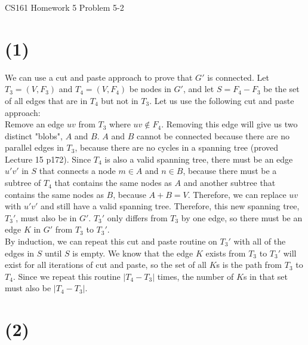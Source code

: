 \documentclass[12pt]{article}
\begin{document}
\begin{center}
{\Large CS161 Homework 5 Problem 5-2}

\end{center}

\section*{(1)}
We can use a cut and paste approach to prove that $G'$ is connected. Let $T_3 = (V, F_3)$ and $T_4 = (V, F_4)$ be nodes in $G'$, and let $S = F_4-F_3$ be the set of all edges that are in $T_4$ but not in $T_3$. Let us use the following cut and paste approach: \\
Remove an edge $uv$ from $T_3$ where $uv \notin F_4$. Removing this edge will give us two distinct "blobs", $A$ and $B$. $A$ and $B$ cannot be connected because there are no parallel edges in $T_3$, because there are no cycles in a spanning tree (proved Lecture 15 p172). Since $T_4$ is also a valid spanning tree, there must be an edge $u'v'$ in $S$ that connects a node $m \in A$ and $n \in B$, because there must be a subtree of $T_4$ that contains the same nodes as $A$ and another subtree that contains the same nodes as $B$, because $A + B = V$. Therefore, we can replace $uv$ with $u'v'$ and still have a valid spanning tree. Therefore, this new spanning tree, $T_3'$, must also be in $G'$. $T_3'$ only differs from $T_3$ by one edge, so there must be an edge $K$ in $G'$ from $T_3$ to $T_3'$.\\
By induction, we can repeat this cut and paste routine on $T_3'$ with all of the edges in $S$ until $S$ is empty. We know that the edge $K$ exists from $T_3$ to $T_3'$ will exist for all iterations of cut and paste, so the set of all $K$s is the path from $T_3$ to $T_4$. Since we repeat this routine $|T_4-T_3|$ times, the number of $K$s in that set must also be $|T_4-T_3|$.

\section*{(2)}
\end{document}
